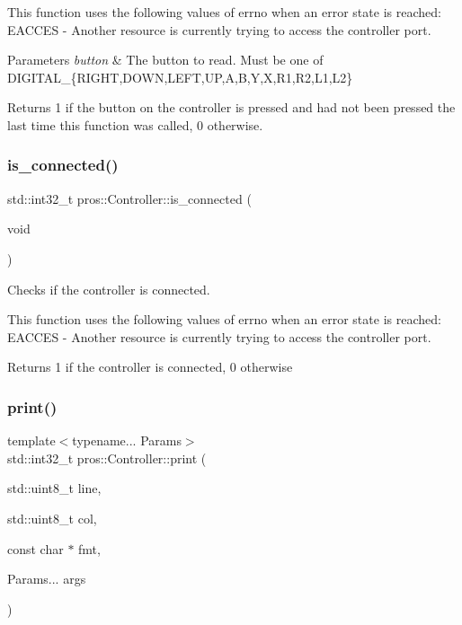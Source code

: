 This function uses the following values of errno when an error state is reached\+: E\+A\+C\+C\+ES -\/ Another resource is currently trying to access the controller port.


\begin{DoxyParams}{Parameters}
{\em button} & The button to read. Must be one of D\+I\+G\+I\+T\+A\+L\+\_\+\{R\+I\+G\+HT,D\+O\+WN,L\+E\+FT,UP,A,B,Y,X,R1,R2,L1,L2\}\\
\hline
\end{DoxyParams}
\begin{DoxyReturn}{Returns}
1 if the button on the controller is pressed and had not been pressed the last time this function was called, 0 otherwise. 
\end{DoxyReturn}
\mbox{\label{classpros_1_1Controller_a1a013e9cf1979487f2daabcd729d3ecb}} 
\subsubsection{\texorpdfstring{is\+\_\+connected()}{is\_connected()}}
{\footnotesize\ttfamily std\+::int32\+\_\+t pros\+::\+Controller\+::is\+\_\+connected (\begin{DoxyParamCaption}\item[{void}]{ }\end{DoxyParamCaption})}



Checks if the controller is connected. 

This function uses the following values of errno when an error state is reached\+: E\+A\+C\+C\+ES -\/ Another resource is currently trying to access the controller port.

\begin{DoxyReturn}{Returns}
1 if the controller is connected, 0 otherwise 
\end{DoxyReturn}
\mbox{\label{classpros_1_1Controller_a4a301df3d34578661271f9b400da1176}} 
\subsubsection{\texorpdfstring{print()}{print()}}
{\footnotesize\ttfamily template$<$typename... Params$>$ \\
std\+::int32\+\_\+t pros\+::\+Controller\+::print (\begin{DoxyParamCaption}\item[{std\+::uint8\+\_\+t}]{line,  }\item[{std\+::uint8\+\_\+t}]{col,  }\item[{const char $\ast$}]{fmt,  }\item[{Params...}]{args }\end{DoxyParamCaption})\hspace{0.3cm}{\ttfamily [inline]}}



